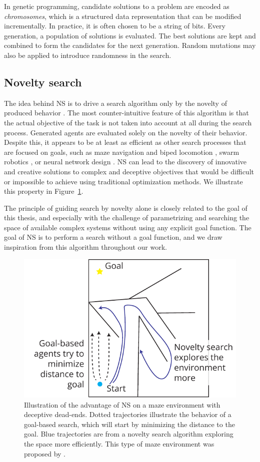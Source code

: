 In genetic programming, candidate solutions to a problem are encoded as
\emph{chromosomes}, which is a structured data representation that can be
modified incrementally. In practice, it is often chosen to be a string of bits.
Every generation, a population of solutions is evaluated. The best solutions are
kept and combined to form the candidates for the next generation. Random
mutations may also be applied to introduce randomness in the search.

\subsection{Novelty search}
The idea behind \ac{NS} is to drive a search algorithm only by the novelty of
produced behavior \parencite{lehmanAbandoningObjectivesEvolution2011}. The most
counter-intuitive feature of this algorithm is that the actual objective of the
task is not taken into account at all during the search process. Generated
agents are evaluated solely on the novelty of their behavior. Despite this, it
appears to be at least as efficient as other search processes that are focused on goals, such as maze navigation and biped locomotion
\parencite{lehmanAbandoningObjectivesEvolution2011}, swarm robotics
\parencite{gomesEvolutionSwarmRobotics2013}, or neural network design
\parencite{risiEvolvingPlasticNeural2010}. \ac{NS} can lead to the discovery 
of innovative and creative solutions to complex and deceptive objectives that 
would be difficult or impossible to achieve using traditional optimization methods. 
We illustrate this property in Figure~\ref{fig:novelty_search}.

The principle of guiding search by novelty alone is closely related to the goal
of this thesis, and especially with the challenge of parametrizing and searching
the space of available complex systems without using any explicit goal function.
The goal of \ac{NS} is to perform a search without a goal function, and we draw
inspiration from this algorithm throughout our work.

\begin{figure}[htbp]
  \centering
  \includegraphics[width=.7\linewidth]{figures/novelty_search}
  \caption{Illustration of the advantage of \acf{NS} on a maze environment with
    deceptive dead-ends. Dotted trajectories illustrate the behavior of a
    goal-based search, which will start by minimizing the distance to the goal.
    Blue trajectories are from a novelty search algorithm exploring the space
    more efficiently. This type of maze environment was proposed by
    \textcite{lehmanAbandoningObjectivesEvolution2011}.}
\label{fig:novelty_search}
\end{figure}

